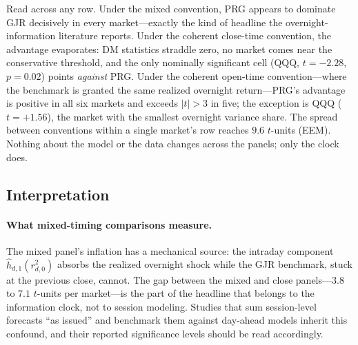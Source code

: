 \documentclass[11pt,a4paper]{article}
\begin{document}
Read across any row. Under the mixed convention, PRG appears to dominate GJR decisively in every market---exactly the kind of headline the overnight-information literature reports. Under the coherent close-time convention, the advantage evaporates: DM statistics straddle zero, no market comes near the conservative threshold, and the only nominally significant cell (QQQ, $t=-2.28$, $p=0.02$) points \emph{against} PRG. Under the coherent open-time convention---where the benchmark is granted the same realized overnight return---PRG's advantage is positive in all six markets and exceeds $|t|>3$ in five; the exception is QQQ ($t=+1.56$), the market with the smallest overnight variance share. The spread between conventions within a single market's row reaches $9.6$ $t$-units (EEM). Nothing about the model or the data changes across the panels; only the clock does.

\subsection{Interpretation}

\paragraph{What mixed-timing comparisons measure.} The mixed panel's inflation has a mechanical source: the intraday component $\hat{h}_{d,1}(r^2_{d,0})$ absorbs the realized overnight shock while the GJR benchmark, stuck at the previous close, cannot. The gap between the mixed and close panels---$3.8$ to $7.1$ $t$-units per market---is the part of the headline that belongs to the information clock, not to session modeling. Studies that sum session-level forecasts ``as issued'' and benchmark them against day-ahead models inherit this confound, and their reported significance levels should be read accordingly.
\end{document}
